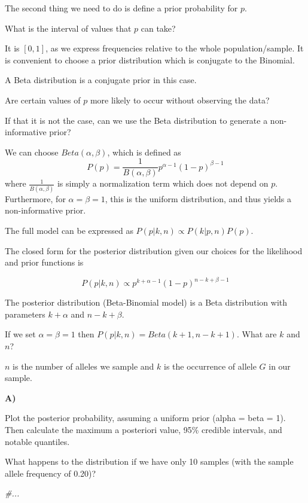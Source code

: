\documentclass[
]{article}
\newenvironment{Shaded}{\begin{snugshade}}{\end{snugshade}}
\newcommand{\CommentTok}[1]{\textcolor[rgb]{0.56,0.35,0.01}{\textit{#1}}}
\begin{document}
The second thing we need to do is define a prior probability for \(p\).

What is the interval of values that \(p\) can take?

It is \([0,1]\), as we express frequencies relative to the whole
population/sample. It is convenient to choose a prior distribution which
is conjugate to the Binomial.

A Beta distribution is a conjugate prior in this case.

Are certain values of \(p\) more likely to occur without observing the
data?

If that it is not the case, can we use the Beta distribution to generate
a non-informative prior?

We can choose \(Beta(\alpha,\beta)\), which is defined as
\begin{equation}
    P(p) = \frac{1}{B(\alpha,\beta)} p^{\alpha-1}(1-p)^{\beta-1}
\end{equation} where \(\frac{1}{B(\alpha,\beta)}\) is simply a
normalization term which does not depend on \(p\). Furthermore, for
\(\alpha = \beta = 1\), this is the uniform distribution, and thus
yields a non-informative prior.

The full model can be expressed as \(P(p|k,n) \propto P(k|p,n)P(p)\).

The closed form for the posterior distribution given our choices for the
likelihood and prior functions is

\begin{equation}
    P(p|k,n) \propto p^{k+\alpha-1}(1-p)^{n-k+\beta-1}
\end{equation}

The posterior distribution (Beta-Binomial model) is a Beta distribution
with parameters \(k+\alpha\) and \(n-k+\beta\).

If we set \(\alpha=\beta=1\) then \(P(p|k,n)=Beta(k+1,n-k+1)\). What are
\(k\) and \(n\)?

\(n\) is the number of alleles we sample and \(k\) is the occurrence of
allele \(G\) in our sample.

\textbf{A)}

Plot the posterior probability, assuming a uniform prior (alpha = beta =
1). Then calculate the maximum a posteriori value, 95\% credible
intervals, and notable quantiles.

What happens to the distribution if we have only 10 samples (with the
sample allele frequency of 0.20)?

\begin{Shaded}
\begin{Highlighting}[]
\CommentTok{\#...}
\end{Highlighting}
\end{Shaded}
\end{document}
